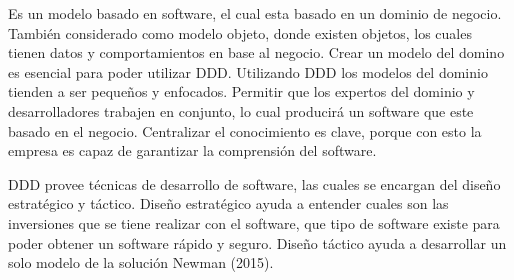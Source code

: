 \documentclass[12pt,twoside]{reedthesis}
\theoremstyle{definition}
\theoremstyle{definition}
\theoremstyle{definition}
\theoremstyle{remark}
\begin{document}
Es un modelo basado en software, el cual esta basado en un dominio de
negocio. También considerado como modelo objeto, donde existen objetos,
los cuales tienen datos y comportamientos en base al negocio. Crear un
modelo del domino es esencial para poder utilizar DDD. Utilizando DDD
los modelos del dominio tienden a ser pequeños y enfocados. Permitir que
los expertos del dominio y desarrolladores trabajen en conjunto, lo cual
producirá un software que este basado en el negocio. Centralizar el
conocimiento es clave, porque con esto la empresa es capaz de garantizar
la comprensión del software.

DDD provee técnicas de desarrollo de software, las cuales se encargan
del diseño estratégico y táctico. Diseño estratégico ayuda a entender
cuales son las inversiones que se tiene realizar con el software, que
tipo de software existe para poder obtener un software rápido y seguro.
Diseño táctico ayuda a desarrollar un solo modelo de la solución Newman
(2015).
\end{document}
